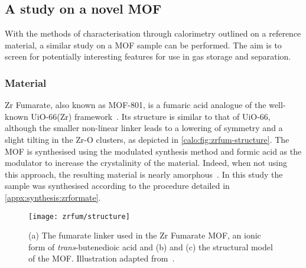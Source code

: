 
\subsection{A study on a novel MOF}

With the methods of characterisation through calorimetry
outlined on a reference material, a similar study on a 
\gls{MOF} sample can be performed. The aim is to screen for 
potentially interesting features for use in gas 
storage and separation.

\subsubsection{Material}

Zr Fumarate, also known as MOF-801, is a fumaric 
acid analogue of the well-known UiO-66(Zr) 
framework~\cite{wissmannModulatedSynthesisZrfumarate2012}.
Its structure is similar to that of UiO-66, although 
the smaller non-linear linker leads to a lowering of 
symmetry and a slight tilting in the Zr-O clusters,
as depicted in \autoref{calo:fig:zrfum-structure}.
The \gls{MOF} is synthesised using the modulated synthesis method and 
formic acid as the modulator to increase the crystalinity of the
material. Indeed, when not using this approach, the resulting
material is nearly amorphous~\cite{zahnInsightMechanismModulated2014}.
In this study the sample was synthesised according to the procedure 
detailed in \autoref{appx:synthesis:zrformate}.

\begin{figure}[htb]
    \centering
    \texttt{[image: zrfum/structure]}%
    \caption{(a) The fumarate linker used in the Zr Fumarate
    \gls{MOF}, an ionic form of \textit{trans}-butenedioic acid and
    (b) and (c) the structural model of the \gls{MOF}. Illustration
    adapted from~\citet{wissmannModulatedSynthesisZrfumarate2012}.}%
    \label{calo:fig:zrfum-structure}
\end{figure}


